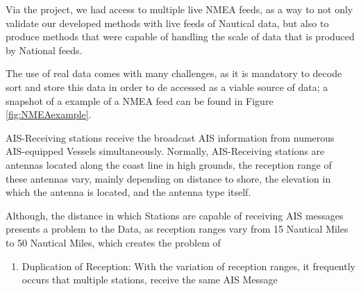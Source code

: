 
Via the project, we had access to multiple live NMEA feeds, as a way to not only validate our developed methods with live feeds of Nautical data, but also to produce methods that were capable of handling the scale of data that is produced by National feeds.

The use of real data comes with many challenges, as it is mandatory to decode sort and store this data in order to de accessed as a viable source of data; a snapshot of a example of a NMEA feed can be found in Figure \ref{fig:NMEAexample}. 


AIS-Receiving stations receive the broadcast AIS information from numerous AIS-equipped Vessels simultaneously. Normally, AIS-Receiving stations are antennas located along the coast line in high grounds, the reception range of these antennas vary, mainly depending on distance to shore, the elevation in which the antenna is located, and the antenna type itself.

Although, the distance in which Stations are capable of receiving AIS messages presents a problem to the Data, as reception ranges vary from 15 Nautical Miles to 50 Nautical Miles, which creates the problem of 

\begin{enumerate}
\item Duplication of Reception:  With the variation of reception ranges, it frequently occurs that multiple stations, receive the same AIS Message


\end{enumerate}



